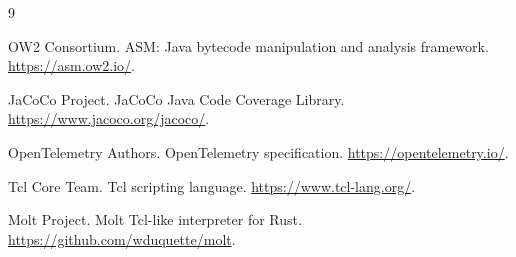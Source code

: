 \documentclass[11pt]{article}
\begin{document}
\begin{thebibliography}{9}

OW2 Consortium.
\newblock ASM: Java bytecode manipulation and analysis framework.
\newblock \url{https://asm.ow2.io/}.

JaCoCo Project.
\newblock JaCoCo Java Code Coverage Library.
\newblock \url{https://www.jacoco.org/jacoco/}.

OpenTelemetry Authors.
\newblock OpenTelemetry specification.
\newblock \url{https://opentelemetry.io/}.

Tcl Core Team.
\newblock Tcl scripting language.
\newblock \url{https://www.tcl-lang.org/}.

Molt Project.
\newblock Molt Tcl-like interpreter for Rust.
\newblock \url{https://github.com/wduquette/molt}.

\end{thebibliography}
\end{document}
